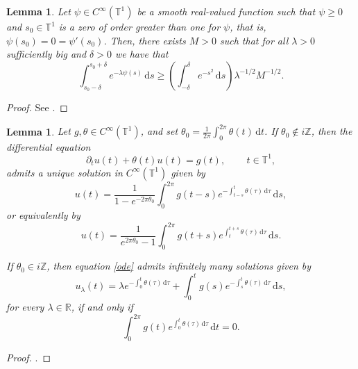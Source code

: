 \documentclass[11pt,reqno]{amsart}
\numberwithin{equation}{section}
\newtheorem{lemma}[theorem]{Lemma}
\theoremstyle{definition}
\theoremstyle{definition}
\newcommand{\T}{\mathbb{T}}
\begin{document}
\begin{lemma}\label{lemmaintegralineq}
	Let $\psi\in C^{\infty}(\T^1)$ be a smooth real-valued function such that $\psi\geq 0$ and $s_0\in\T^1$ is a zero of order greater than one for $\psi$, that is, $\psi(s_0)=0=\psi'(s_0)$. Then, there exists $M>0$ such that for all $\lambda>0$ sufficiently big and $\delta>0$ we have that
	$$\int_{s_0-\delta}^{s_0+\delta}e^{-\lambda\psi(s)}\,\mathrm{d}s\geq \left(\int_{-\delta}^{\delta}e^{-s^2}\,\mathrm{d}s\right)\lambda^{-1/2}M^{-1/2}.$$
\end{lemma}
\begin{proof}
	See \cite{KowTmRn}.
\end{proof}

\begin{lemma}\label{lemmaodesol}
	Let $g,\theta \in C^{\infty}(\T^1)$, and set $\theta_0 = \frac{1}{2\pi}\int_0^{2\pi}\theta(t)\,\mathrm{d}t$. If $\theta_0\not\in i\mathbb{Z}$, then the differential equation
	\begin{equation}\label{ode}
		\partial_t u(t)+\theta(t)u(t)=g(t),\,\qquad t\in\T^1,
	\end{equation}
	admits a unique solution in $C^\infty(\T^1)$ given by
	\begin{equation}\label{sol-}
		u(t) = \frac{1}{1-e^{-2\pi\theta_0}}\int_0^{2\pi}g(t-s)e^{-\int_{t-s}^t\theta(\tau)\,\mathrm{d}\tau}\,\mathrm{d}s,
	\end{equation} 
	or equivalently by
	\begin{equation}\label{sol+}
		u(t) = \frac{1}{e^{2\pi\theta_0}-1}\int_0^{2\pi}g(t+s)e^{\int_{t}^{t+s}\theta(\tau)\,\mathrm{d}\tau}\,\mathrm{d}s.
	\end{equation}
	
	If $\theta_0\in i\mathbb{Z}$, then equation \eqref{ode} admits infinitely many solutions given by
	\begin{equation*}
		u_\lambda(t) = \lambda e^{-\int_0^t\theta(\tau)\,\mathrm{d}\tau}+\int_0^t g(s)e^{-\int_s^t\theta(\tau)\,\mathrm{d}\tau}\,\mathrm{d}s,
	\end{equation*}
	for every $\lambda\in\mathbb{R}$, if and only if
	$$ \int_0^{2\pi}g(t)e^{\int_0^t\theta(\tau)\,\mathrm{d}\tau}\,\mathrm{d}t=0.$$
\end{lemma}
\begin{proof}
   \cite[Lemma A.4]{Lucy}.
\end{proof}





\end{document}
